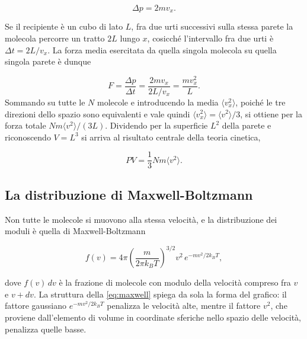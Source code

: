 \begin{equation}
    \Delta p = 2mv_x .
    \label{eq:qdmurto}
\end{equation}

Se il recipiente è un cubo di lato $L$, fra due urti successivi sulla stessa parete la molecola percorre un tratto $2L$ lungo $x$, cosicché l'intervallo fra due urti è $\Delta t = 2L/v_x$.
La forza media esercitata da quella singola molecola su quella singola parete è dunque

\begin{equation}
    F = \frac{\Delta p}{\Delta t} = \frac{2mv_x}{2L/v_x} = \frac{mv_x^2}{L}.
    \label{eq:forzasingola}
\end{equation}
Sommando su tutte le $N$ molecole e introducendo la media $\langle v_x^2\rangle$, poiché le tre direzioni dello spazio sono equivalenti e vale quindi $\langle v_x^2\rangle = \langle v^2\rangle/3$, si ottiene per la forza totale $Nm\langle v^2\rangle/(3L)$.
Dividendo per la superficie $L^2$ della parete e riconoscendo $V = L^3$ si arriva al risultato centrale della teoria cinetica,

\begin{equation}
    PV = \frac{1}{3}Nm\langle v^2\rangle .
    \label{eq:cineticabase}
\end{equation}

\subsection{La distribuzione di Maxwell-Boltzmann}

Non tutte le molecole si muovono alla stessa velocità, e la distribuzione dei moduli è quella di Maxwell-Boltzmann

\begin{equation}
    f(v) = 4\pi\left(\frac{m}{2\pi k_BT}\right)^{3/2} v^2 \, e^{-mv^2/2k_BT},
    \label{eq:maxwell}
\end{equation}

dove $f(v)\,dv$ è la frazione di molecole con modulo della velocità compreso fra $v$ e $v + dv$.
La struttura della \eqref{eq:maxwell} spiega da sola la forma del grafico: il fattore gaussiano $e^{-mv^2/2k_BT}$ penalizza le velocità alte, mentre il fattore $v^2$, che proviene dall'elemento di volume in coordinate sferiche nello spazio delle velocità, penalizza quelle basse.


